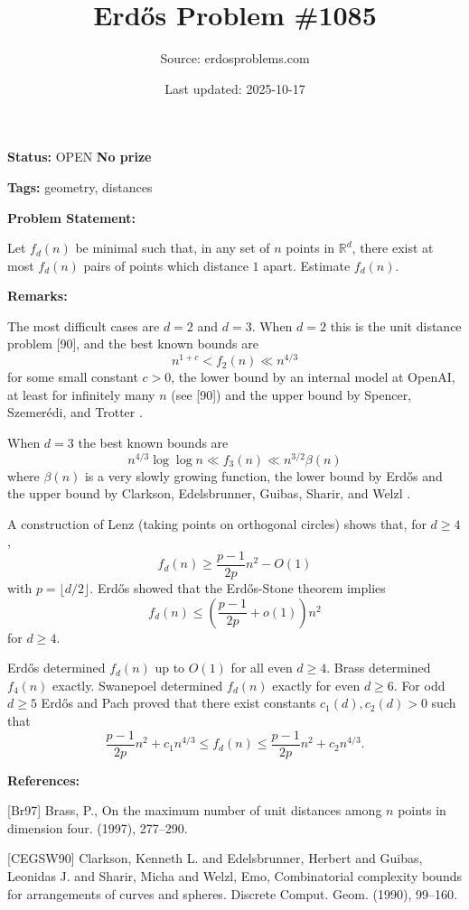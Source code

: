 \documentclass{article}
\title{Erd\H{o}s Problem \#1085}
\date{Last updated: 2025-10-17}
\author{Source: erdosproblems.com}
\begin{document}
\maketitle

\noindent\textbf{Status:} OPEN \quad \textbf{No prize}

\noindent\textbf{Tags:} geometry, distances

\medskip
\noindent\textbf{Problem Statement:}

Let $f_d(n)$ be minimal such that, in any set of $n$ points in $\mathbb{R}^d$, there exist at most $f_d(n)$ pairs of points which distance $1$ apart. Estimate $f_d(n)$.

\bigskip
\noindent\textbf{Remarks:}

The most difficult cases are $d=2$ and $d=3$. When $d=2$ this is the unit distance problem [90], and the best known bounds are\[n^{1+c}< f_2(n) \ll n^{4/3}\]for some small constant $c>0$, the lower bound by an internal model at OpenAI, at least for infinitely many $n$ (see [90]) and the upper bound by Spencer, Szemer\'{e}di, and Trotter \cite{SST84}.

When $d=3$ the best known bounds are\[n^{4/3}\log\log n \ll f_3(n) \ll n^{3/2}\beta(n)\]where $\beta(n)$ is a very slowly growing function, the lower bound by Erd\H{o}s \cite{Er60b} and the upper bound by Clarkson, Edelsbrunner, Guibas, Sharir, and Welzl \cite{CEGSW90}.

A construction of Lenz (taking points on orthogonal circles) shows that, for $d\geq 4$,\[f_d(n)\geq \frac{p-1}{2p}n^2-O(1)\]with $p=\lfloor d/2\rfloor$. Erd\H{o}s \cite{Er60b} showed that the Erd\H{o}s-Stone theorem implies\[f_d(n) \leq \left(\frac{p-1}{2p}+o(1)\right)n^2\]for $d\geq 4$.

Erd\H{o}s \cite{Er67e} determined $f_d(n)$ up to $O(1)$ for all even $d\geq 4$. Brass \cite{Br97} determined $f_4(n)$ exactly. Swanepoel \cite{Sw09} determined $f_d(n)$ exactly for even $d\geq 6$. For odd $d\geq 5$ Erd\H{o}s and Pach \cite{ErPa90} proved that there exist constants $c_1(d),c_2(d)>0$ such that\[\frac{p-1}{2p}n^2 +c_1n^{4/3}\leq f_d(n) \leq \frac{p-1}{2p}n^2 +c_2n^{4/3}.\]

\bigskip
\noindent\textbf{References:}

[Br97] Brass, P., On the maximum number of unit distances among {$n$} points in
dimension four. (1997), 277--290.
 
 [CEGSW90] Clarkson, Kenneth L. and Edelsbrunner, Herbert and Guibas,
Leonidas J. and Sharir, Micha and Welzl, Emo, Combinatorial complexity bounds for arrangements of curves and
spheres. Discrete Comput. Geom. (1990), 99--160.
 
\end{document}
